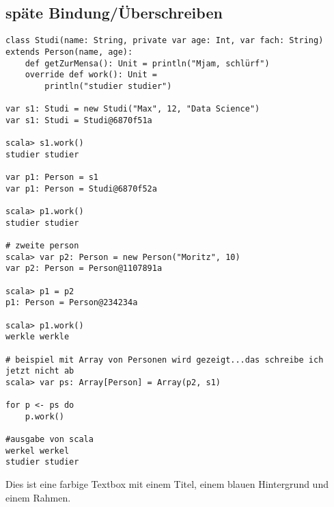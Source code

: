 \documentclass{article}
\begin{document}
\subsection{späte Bindung/Überschreiben}
\begin{verbatim}
class Studi(name: String, private var age: Int, var fach: String) extends Person(name, age):
	def getZurMensa(): Unit = println("Mjam, schlürf")
	override def work(): Unit =
		println("studier studier")
		
var s1: Studi = new Studi("Max", 12, "Data Science")
var s1: Studi = Studi@6870f51a

scala> s1.work()
studier studier

var p1: Person = s1
var p1: Person = Studi@6870f52a

scala> p1.work()
studier studier

# zweite person
scala> var p2: Person = new Person("Moritz", 10)
var p2: Person = Person@1107891a

scala> p1 = p2
p1: Person = Person@234234a

scala> p1.work()
werkle werkle

# beispiel mit Array von Personen wird gezeigt...das schreibe ich jetzt nicht ab
scala> var ps: Array[Person] = Array(p2, s1)

for p <- ps do
	p.work()
	
#ausgabe von scala
werkel werkel
studier studier
\end{verbatim}

\begin{tcolorbox}[colback=blue!5!white, colframe=blue!75!black, title=Beispiel-Titel, width=\textwidth]
Dies ist eine farbige Textbox mit einem Titel, einem blauen Hintergrund und einem Rahmen.
\end{tcolorbox}
\end{document}
